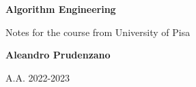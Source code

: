 \begin{titlepage}
    \begin{center}
        \vspace*{1cm}

        \huge
        \textbf{Algorithm Engineering}

        \vspace{0.5cm}

        Notes for the course from University of Pisa

        \vspace{1.5cm}

        \textbf{Aleandro Prudenzano}

        \vfill
        \vspace{0.8cm}

        A.A. 2022-2023

    \end{center}
\end{titlepage}

\clearpage
\begingroup
  \pagestyle{empty}
  \null
  \newpage
\endgroup

\renewcommand{\contentsname}{Index}
\tableofcontents

\clearpage
\begingroup
  \pagestyle{empty}
  \null
  \newpage
\endgroup